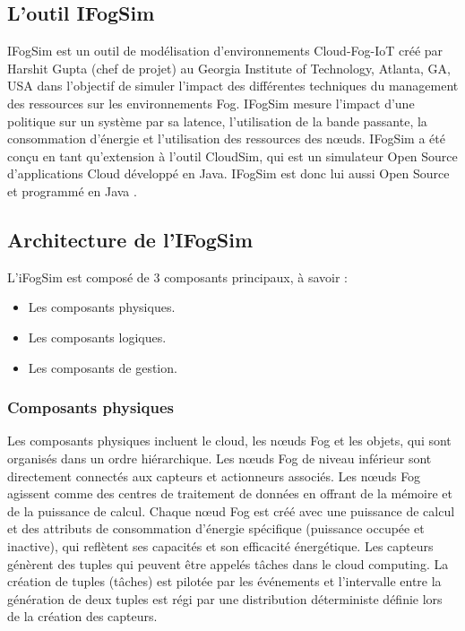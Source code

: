 \subsection{L'outil IFogSim}
IFogSim est un outil de modélisation d'environnements Cloud-Fog-IoT créé par
Harshit Gupta (chef de projet) au Georgia Institute of Technology, Atlanta, GA, USA dans l'objectif de simuler l'impact des différentes techniques du management des ressources sur les environnements Fog. IFogSim mesure l'impact d'une politique sur un système par sa latence, l'utilisation de la bande passante, la consommation d'énergie et l'utilisation des ressources des nœuds. IFogSim a été conçu en tant qu'extension à l'outil CloudSim, qui est un simulateur Open Source d'applications Cloud développé en Java. IFogSim est donc lui aussi Open Source et programmé en Java .

\subsection{Architecture de l'IFogSim}
L'iFogSim est composé de 3 composants principaux, à savoir : 
\begin{itemize}
    \item Les composants physiques.
    \item Les composants logiques.
    \item Les composants de gestion.
\end{itemize}

\subsubsection{Composants physiques}
Les composants physiques incluent le cloud, les nœuds Fog et les objets, qui sont organisés dans un ordre hiérarchique. Les nœuds Fog de niveau inférieur sont directement connectés aux capteurs et actionneurs associés. Les nœuds Fog agissent comme des centres de traitement de données en offrant de la mémoire et de la puissance de calcul. Chaque nœud Fog est créé avec une puissance de calcul et des attributs de consommation d'énergie spécifique (puissance occupée et inactive), qui reflètent ses capacités et son efficacité énergétique. Les capteurs génèrent des tuples qui peuvent être appelés tâches dans le cloud computing. La création de tuples (tâches) est pilotée par les événements et l'intervalle entre la génération de deux tuples est régi par une distribution déterministe définie lors de la création des capteurs.

